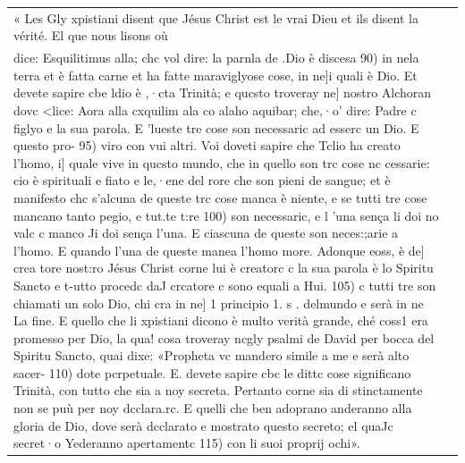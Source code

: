 \begin{longtable}{p{}p{}}
« Les Gly xpistiani disent que Jésus Christ est le vrai Dieu et ils disent la vérité. El que nous lisons où \\
dice: Esquilitimus alla; chc vol dire: la parnla de .Dio è discesa
90) in nela terra et è fatta carne et ha fatte maraviglyose cose, in ne]i quali è Dio. Et devete sapire cbe ldio è ,·cta Trinità; e qucsto troveray ne] nostro Alchoran dovc <lice: Aora alla cxquilim ala co alaho aquibar; che,·o'  dire: Padre c figlyo e la sua parola. E 'lueste tre cose son necessaric ad esserc un Dio. E questo pro-
95) viro con vui altri. Voi doveti sapire che Tclio ha creato l'homo, i] quale vive in qucsto mundo, che in quello son trc cose nc  cessarie: cio è spirituali e fiato e le,·ene del rore che son pieni de sangue; et è manifesto chc s'alcuna de queste trc cose manca è niente, e se tutti tre cose mancano tanto pegio, e tut.te t:re
100) son necessaric, e l 'una sença li doi no valc c manco Ji doi sença l'una. E ciascuna de queste son neces:;arie a l'homo. E quando l'una de queste manea l'homo more. Adonque eoss, è de] crea  tore nost:ro Jésus Christ corne lui è creatorc c la sua parola è lo Spiritu Sancto e t-utto procedc daJ crcatore c sono equali a Hui.
105) c tutti tre son chiamati  un solo Dio,  chi  cra  in  ne] 1 principio  1. s .
delmundo e serà in ne La fine. E quello che li xpistiani dicono è multo verità grande, ché coss1 era promesso per Dio, la qua! cosa troveray ncgly psalmi de David per bocca del Spiritu Sancto, quai dixe: «Propheta vc mandero simile a me e serà alto sacer-
110) dote pcrpetuale. E. devete sapire cbc le dittc cose significano Trinità, con tutto che sia a noy secreta. Pertanto corne sia di  stinctamente non se puù per noy dcclara.rc. E quelli che ben adoprano anderanno alla gloria de Dio, dove serà dcclarato e mostrato questo secreto; el quaJc secret·o Yederanno apertamentc
115) con li suoi proprij ochi». &


\end{longtable}
